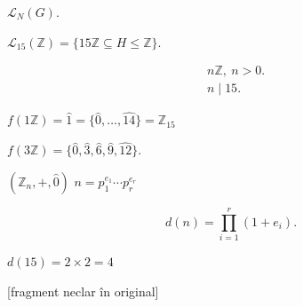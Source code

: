 \documentclass[12pt]{article}
\begin{document}
\bigskip
\noindent $\mathcal{L}_N(G)$.

\noindent $\mathcal{L}_{15}(\mathbb{Z}) = \{15\mathbb{Z}\subseteq H\leq \mathbb{Z}\}$.

\[
\begin{aligned}
&n\mathbb{Z}, \ n>0.\\
&n\mid 15.
\end{aligned}
\]

\bigskip
\noindent $f(1\mathbb{Z}) = \hat 1 = \{\hat 0,\ldots,\hat{14}\} = \mathbb{Z}_{15}$

\noindent $f(3\mathbb{Z}) = \{\hat 0,\hat 3,\hat 6,\hat 9,\hat{12}\}$.

\bigskip
\noindent $(\mathbb{Z}_n,+,\hat 0)$ \quad $n=p_1^{e_1}\cdots p_r^{e_r}$

\[
d(n) = \prod_{i=1}^{r}(1+e_i).
\]

\noindent $d(15) = 2\times 2 = 4$

\noindent \footnotesize [fragment neclar în original]\normalsize
\end{document}
